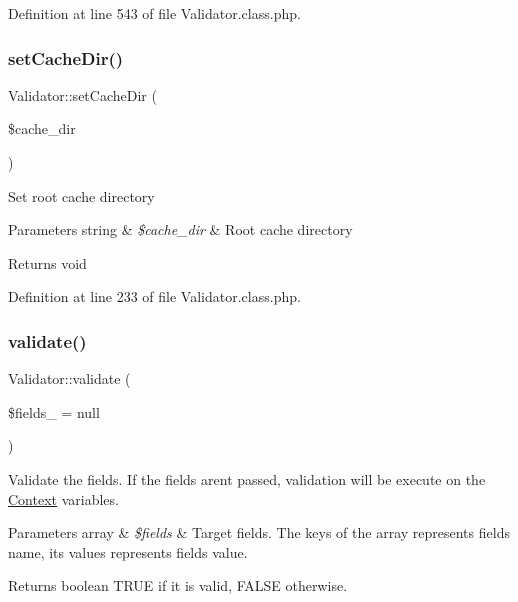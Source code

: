 Definition at line 543 of file Validator.\+class.\+php.

\mbox{\label{classValidator_a1630131530dca60428e72dd4dd2d4af3}} 
\subsubsection{\texorpdfstring{set\+Cache\+Dir()}{setCacheDir()}}
{\footnotesize\ttfamily Validator\+::set\+Cache\+Dir (\begin{DoxyParamCaption}\item[{}]{\$cache\+\_\+dir }\end{DoxyParamCaption})}

Set root cache directory 
\begin{DoxyParams}[1]{Parameters}
string & {\em \$cache\+\_\+dir} & Root cache directory \\
\hline
\end{DoxyParams}
\begin{DoxyReturn}{Returns}
void 
\end{DoxyReturn}


Definition at line 233 of file Validator.\+class.\+php.

\mbox{\label{classValidator_a05e34dac507b8d719e7f95f2cd0220bc}} 
\subsubsection{\texorpdfstring{validate()}{validate()}}
{\footnotesize\ttfamily Validator\+::validate (\begin{DoxyParamCaption}\item[{}]{\$fields\+\_\+ = {\ttfamily null} }\end{DoxyParamCaption})}

Validate the fields. If the fields aren\textquotesingle{}t passed, validation will be execute on the \hyperlink{classContext}{Context} variables. 
\begin{DoxyParams}[1]{Parameters}
array & {\em \$fields} & Target fields. The keys of the array represents field\textquotesingle{}s name, its values represents field\textquotesingle{}s value. \\
\hline
\end{DoxyParams}
\begin{DoxyReturn}{Returns}
boolean T\+R\+UE if it is valid, F\+A\+L\+SE otherwise. 
\end{DoxyReturn}


